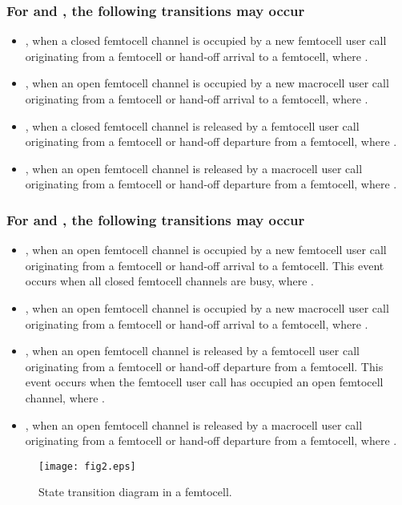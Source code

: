 \documentclass[10pt,final,journal,letterpaper,twoside,twocolumn]{IEEEtran}
\begin{document}
\subsubsection{For  and , the following transitions may occur}

\begin{itemize}
    \item , when a closed
femtocell channel is occupied by a new femtocell user call originating from a femtocell or hand-off arrival to a femtocell, where .
    \item , when an open
femtocell channel is occupied by a new macrocell user call originating from a femtocell or hand-off arrival to a femtocell, where .
    \item , when a closed
femtocell channel is released by a femtocell user call originating from a femtocell or hand-off departure from a femtocell, where .
    \item , when an
open femtocell channel is released by a macrocell user call originating from a femtocell or hand-off departure from a femtocell, where .
\end{itemize}
\subsubsection{For   and  ,
the following transitions may occur}

\begin{itemize}
    \item , when an open
femtocell channel is occupied by a new femtocell user call originating from a femtocell or hand-off arrival to a femtocell. This event occurs
when all closed femtocell channels are busy, where .
    \item , when an open
femtocell channel is occupied by a new macrocell user call originating from a femtocell or hand-off arrival to a femtocell, where .
    \item , when an open
femtocell channel is released by a femtocell user call originating from a femtocell or hand-off departure from a femtocell. This event occurs when the
femtocell user call has occupied an open femtocell channel, where .
    \item , when an open
femtocell channel is released by a macrocell user call originating from a femtocell or hand-off departure from a femtocell, where .
\end{itemize}
\begin{figure}
\vspace{0.1in}
\centerline{\texttt{[image: fig2.eps]}}
\caption{\small State transition diagram in a femtocell.}
\end{figure}
\end{document}
